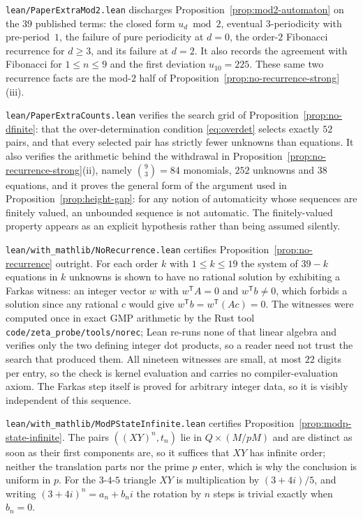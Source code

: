 \documentclass[11pt]{article}
\theoremstyle{plain}
\theoremstyle{definition}
\theoremstyle{remark}
\begin{document}
\texttt{lean/PaperExtraMod2.lean} discharges Proposition~\ref{prop:mod2-automaton} on the $39$
published terms: the closed form $u_d \bmod 2$, eventual $3$-periodicity with pre-period~$1$,
the failure of pure periodicity at $d=0$, the order-$2$ Fibonacci recurrence for $d \ge 3$,
and its failure at $d=2$. It also records the agreement with Fibonacci for $1 \le n \le 9$ and
the first deviation $u_{10}=225$. These same two recurrence facts are the mod-$2$ half of
Proposition~\ref{prop:no-recurrence-strong}(iii).

\texttt{lean/PaperExtraCounts.lean} verifies the search grid of
Proposition~\ref{prop:no-dfinite}: that the over-determination condition
\eqref{eq:overdet} selects exactly $52$ pairs, and that every selected pair has strictly
fewer unknowns than equations. It also verifies the arithmetic behind the withdrawal in
Proposition~\ref{prop:no-recurrence-strong}(ii), namely $\binom{9}{3}=84$ monomials, $252$
unknowns and $38$ equations, and it proves the general form of the argument used in
Proposition~\ref{prop:height-gap}: for any notion of automaticity whose sequences are finitely
valued, an unbounded sequence is not automatic. The finitely-valued property appears as an
explicit hypothesis rather than being assumed silently.

\texttt{lean/with\_mathlib/NoRecurrence.lean} certifies
Proposition~\ref{prop:no-recurrence} outright. For each
order $k$ with $1 \le k \le 19$ the system of $39-k$ equations in $k$ unknowns is shown to
have no rational solution by exhibiting a Farkas witness: an integer vector $w$ with
$w^{\mathsf{T}}A = 0$ and $w^{\mathsf{T}}b \neq 0$, which forbids a solution since any
rational $c$ would give $w^{\mathsf{T}}b = w^{\mathsf{T}}(Ac) = 0$. The witnesses were
computed once in exact GMP arithmetic by the Rust tool \texttt{code/zeta\_probe/tools/norec};
Lean re-runs none of that linear algebra and verifies only the two defining integer dot
products, so a reader need not trust the search that produced them. All nineteen witnesses
are small, at most $22$ digits per entry, so the check is kernel evaluation and carries no
compiler-evaluation axiom. The Farkas step itself is proved for arbitrary integer data, so it
is visibly independent of this sequence.

\texttt{lean/with\_mathlib/ModPStateInfinite.lean} certifies
Proposition~\ref{prop:modp-state-infinite}. The
pairs $((XY)^n, t_n)$ lie in $Q \times (M/pM)$ and are distinct as soon as their first
components are, so it suffices that $XY$ has infinite order; neither the translation parts
nor the prime $p$ enter, which is why the conclusion is uniform in $p$. For the $3$-$4$-$5$
triangle $XY$ is multiplication by $(3+4i)/5$, and writing $(3+4i)^n = a_n + b_n i$ the
rotation by $n$ steps is trivial exactly when $b_n = 0$.
\end{document}

